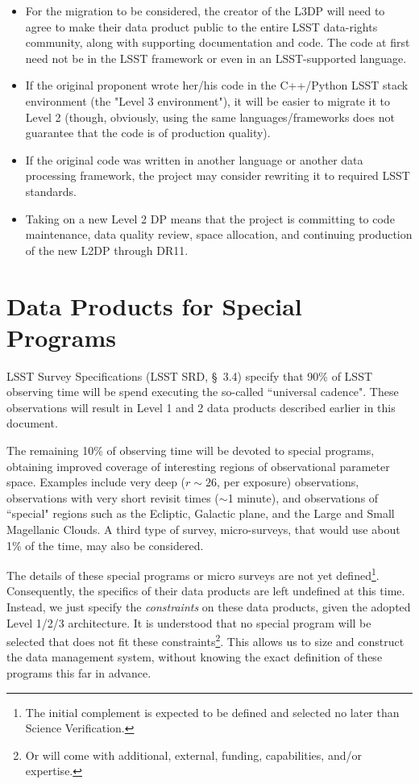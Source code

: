 \documentclass[12pt]{article}
\begin{document}
\begin{itemize}
\item For the migration to be considered, the creator of the L3DP will need to agree to make their data product public to the entire LSST data-rights community, along with supporting documentation and code. The code at first need not be in the LSST framework or even in an LSST-supported language.
\item If the original proponent wrote her/his code in the C++/Python LSST stack environment (the "Level 3 environment"), it will be easier to migrate it to Level 2 (though, obviously, using the same languages/frameworks does not guarantee that the code is of production quality).
\item If the original code was written in another language or another data processing framework, the project may consider rewriting it to required LSST standards.
\item Taking on a new Level 2 DP means that the project is committing to code maintenance, data quality review, space allocation, and continuing production of the new L2DP through DR11.
\end{itemize}

\clearpage

\section{Data Products for Special Programs}
\label{sec:specialProgs}

LSST Survey Specifications (LSST SRD, \S~3.4) specify that 90\% of LSST observing time will be spend executing the so-called ``universal cadence". These observations will result in Level 1 and 2 data products described earlier in this document.

The remaining 10\% of observing time will be devoted to special programs, obtaining improved coverage of interesting regions of observational parameter space. Examples include very deep ($r \sim 26$, per exposure) observations, observations with very short revisit times ($\sim$1 minute), and observations of ``special" regions such as the Ecliptic, Galactic plane, and the Large and Small Magellanic Clouds. A third type of survey, micro-surveys, that would use about 1\% of the time, may also be considered.

The details of these special programs or micro surveys are not yet defined\footnote{The initial complement is expected to be defined and selected no later than Science Verification.}. Consequently, the specifics of their data products are left undefined at this time. Instead, we just specify the {\em constraints} on these data products, given the adopted Level 1/2/3 architecture. It is understood that no special program will be selected that does not fit these constraints\footnote{Or will come with additional, external, funding, capabilities, and/or expertise.}. This allows us to size and construct the data management system, without knowing the exact definition of these programs this far in advance.
\\
\end{document}
